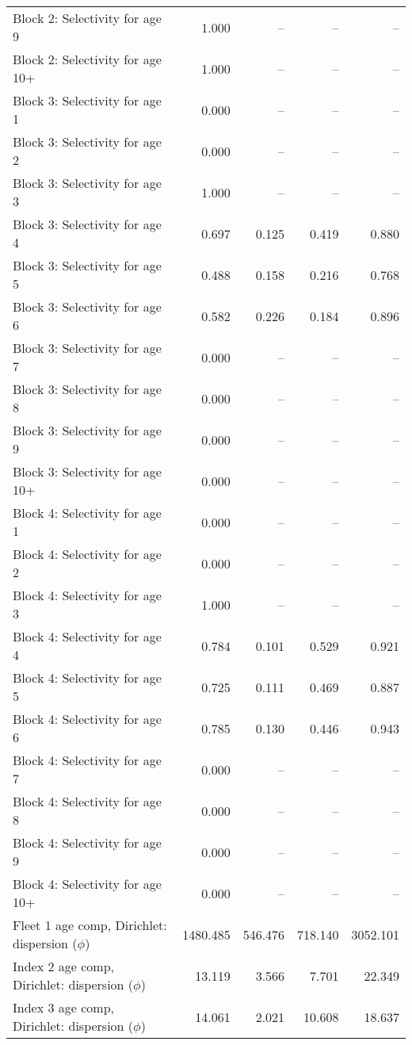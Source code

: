 \documentclass[
]{article}
\begin{document}
\begin{landscape}
\begin{longtable}[t]{lrrrr}
Block 2: Selectivity for age 9 & 1.000 & -- & -- & --\\
Block 2: Selectivity for age 10+ & 1.000 & -- & -- & --\\
Block 3: Selectivity for age 1 & 0.000 & -- & -- & --\\
Block 3: Selectivity for age 2 & 0.000 & -- & -- & --\\
\addlinespace
Block 3: Selectivity for age 3 & 1.000 & -- & -- & --\\
Block 3: Selectivity for age 4 & 0.697 & 0.125 & 0.419 & 0.880\\
Block 3: Selectivity for age 5 & 0.488 & 0.158 & 0.216 & 0.768\\
Block 3: Selectivity for age 6 & 0.582 & 0.226 & 0.184 & 0.896\\
Block 3: Selectivity for age 7 & 0.000 & -- & -- & --\\
\addlinespace
Block 3: Selectivity for age 8 & 0.000 & -- & -- & --\\
Block 3: Selectivity for age 9 & 0.000 & -- & -- & --\\
Block 3: Selectivity for age 10+ & 0.000 & -- & -- & --\\
Block 4: Selectivity for age 1 & 0.000 & -- & -- & --\\
Block 4: Selectivity for age 2 & 0.000 & -- & -- & --\\
\addlinespace
Block 4: Selectivity for age 3 & 1.000 & -- & -- & --\\
Block 4: Selectivity for age 4 & 0.784 & 0.101 & 0.529 & 0.921\\
Block 4: Selectivity for age 5 & 0.725 & 0.111 & 0.469 & 0.887\\
Block 4: Selectivity for age 6 & 0.785 & 0.130 & 0.446 & 0.943\\
Block 4: Selectivity for age 7 & 0.000 & -- & -- & --\\
\addlinespace
Block 4: Selectivity for age 8 & 0.000 & -- & -- & --\\
Block 4: Selectivity for age 9 & 0.000 & -- & -- & --\\
Block 4: Selectivity for age 10+ & 0.000 & -- & -- & --\\
Fleet 1 age comp, Dirichlet: dispersion ($\phi$) & 1480.485 & 546.476 & 718.140 & 3052.101\\
Index 2 age comp, Dirichlet: dispersion ($\phi$) & 13.119 & 3.566 & 7.701 & 22.349\\
\addlinespace
Index 3 age comp, Dirichlet: dispersion ($\phi$) & 14.061 & 2.021 & 10.608 & 18.637\\*
\end{longtable}
\end{landscape}
\end{document}
